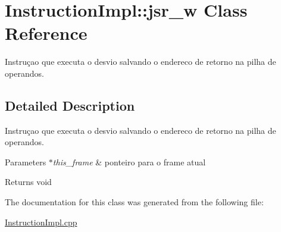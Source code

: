 \hypertarget{class_instruction_impl_1_1jsr__w}{}\section{Instruction\+Impl\+:\+:jsr\+\_\+w Class Reference}
\label{class_instruction_impl_1_1jsr__w}


Instruçao que executa o desvio salvando o endereco de retorno na pilha de operandos.  




\subsection{Detailed Description}
Instruçao que executa o desvio salvando o endereco de retorno na pilha de operandos. 


\begin{DoxyParams}{Parameters}
{\em $\ast$this\+\_\+frame} & ponteiro para o frame atual \\
\hline
\end{DoxyParams}
\begin{DoxyReturn}{Returns}
void 
\end{DoxyReturn}


The documentation for this class was generated from the following file\+:\begin{DoxyCompactItemize}
\item 
\hyperlink{_instruction_impl_8cpp}{Instruction\+Impl.\+cpp}\end{DoxyCompactItemize}
